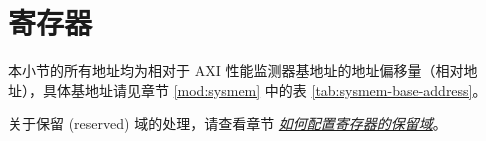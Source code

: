 \documentclass[main\_\_CN.tex]{subfiles}
\begin{document}

\newpage
\section{寄存器}

本小节的所有地址均为相对于 AXI 性能监测器基地址的地址偏移量（相对地址），具体基地址请见章节 \ref{mod:sysmem} \textit{} 中的表 \ref{tab:sysmem-base-address}。

关于保留 (reserved) 域的处理，请查看章节 \hyperref[programming-reserved-field]{\textit{如何配置寄存器的保留域}}。



\end{document}
